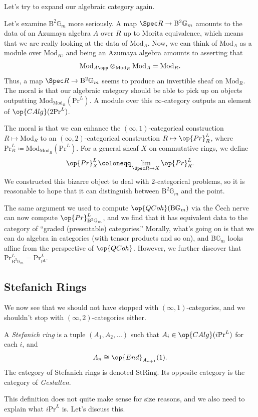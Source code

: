\documentclass[../notes.tex]{subfiles}
\begin{document}
Let's try to expand our algebraic category again.
\begin{example}
	Let's examine $\mathrm B^2\mathbb G_m$ more seriously. A map $\Spec R\to\mathrm B^2\mathbb G_m$ amounts to the data of an Azumaya algebra $A$ over $R$ up to Morita equivalence, which means that we are really looking at the data of $\mathrm{Mod}_A$. Now, we can think of $\mathrm{Mod}_A$ as a module over $\mathrm{Mod}_R$, and being an Azumaya algebra amounts to asserting that
	\[\mathrm{Mod}_{A\opp}\otimes_{\mathrm{Mod}_R}\mathrm{Mod}_A=\mathrm{Mod}_R.\]
	Thus, a map $\Spec R\to\mathrm B^2\mathbb G_m$ seems to produce an invertible sheaf on $\mathrm{Mod}_R$. The moral is that our algebraic category should be able to pick up on objects outputting $\mathrm{Mod}_{\mathrm{Mod}_R}(\mathrm{Pr}^L)$. A module over this $\infty$-category outputs an element of $\op{CAlg}(2\mathrm{Pr}^L)$.
\end{example}
The moral is that we can enhance the $(\infty,1)$-categorical construction $R\mapsto\mathrm{Mod}_R$ to an $(\infty,2)$-categorical construction $R\mapsto\op{Pr}^L_R$, where $\mathrm{Pr}^L_R\coloneqq\mathrm{Mod}_{\mathrm{Mod}_R}(\mathrm{Pr}^L)$. For a general sheaf $X$ on commutative rings, we define
\[\op{Pr}^L_X\coloneqq\lim_{\Spec R\to X}\op{Pr}^L_R.\]
We constructed this bizarre object to deal with $2$-categorical problems, so it is reasonable to hope that it can distinguish between $\mathrm B^2\mathbb G_m$ and the point.
\begin{example}
	The same argument we used to compute $\op{QCoh}(\mathrm B\mathbb G_m)$ via the \v{C}ech nerve can now compute $\op{Pr}^L_{\mathrm B^2\mathbb G_m}$, and we find that it has equivalent data to the category of ``graded (presentable) categories.'' Morally, what's going on is that we can do algebra in categories (with tensor products and so on), and $\mathrm B\mathbb G_m$ looks affine from the perspective of $\op{QCoh}$. However, we further discover that $\mathrm{Pr}^L_{\mathrm B^3\mathbb G_m}=\mathrm{Pr}^L_{\mathrm{pt}}$.
\end{example}

\subsection{Stefanich Rings}
We now see that we should not have stopped with $(\infty,1)$-categories, and we shouldn't stop with $(\infty,2)$-categories either.
\begin{definition}
	A \textit{Stefanich ring} is a tuple $(A_1,A_2,\ldots)$ such that $A_i\in\op{CAlg}(i\mathrm{Pr}^{L})$ for each $i$, and
	\[A_n\cong\op{End}_{A_{n+1}}(1).\]
	The category of Stefanich rings is denoted $\mathrm{StRing}$. Its opposite category is the category of \textit{Gestalten}.
\end{definition}
This definition does not quite make sense for size reasons, and we also need to explain what $i\mathrm{Pr}^L$ is. Let's discuss this.
\end{document}
